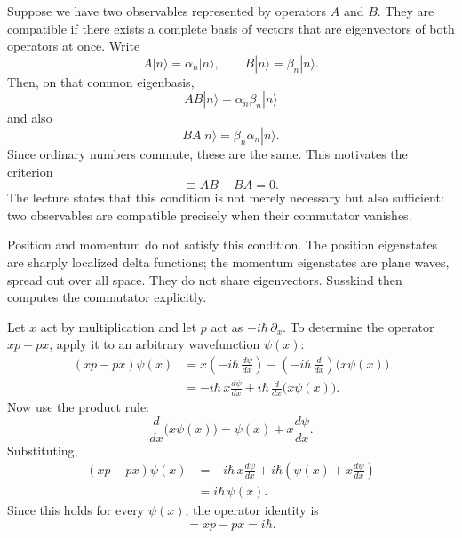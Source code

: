 Suppose we have two observables represented by operators \(A\) and \(B\). They are compatible if there exists a complete basis of vectors that are eigenvectors of both operators at once. Write
\begin{equation}
A|n\rangle = \alpha_n |n\rangle,
\qquad
B|n\rangle = \beta_n |n\rangle.
\end{equation}
Then, on that common eigenbasis,
\begin{equation}
AB|n\rangle = \alpha_n \beta_n |n\rangle
\end{equation}
and also
\begin{equation}
BA|n\rangle = \beta_n \alpha_n |n\rangle.
\end{equation}
Since ordinary numbers commute, these are the same. This motivates the criterion
\begin{equation}
[A,B]\equiv AB-BA=0.
\end{equation}
The lecture states that this condition is not merely necessary but also sufficient: two observables are compatible precisely when their commutator vanishes.

Position and momentum do not satisfy this condition. The position eigenstates are sharply localized delta functions; the momentum eigenstates are plane waves, spread out over all space. They do not share eigenvectors. Susskind then computes the commutator explicitly.

Let \(x\) act by multiplication and let \(p\) act as \(-i\hbar\,\partial_x\). To determine the operator \(xp-px\), apply it to an arbitrary wavefunction \(\psi(x)\):
\begin{align}
(xp-px)\psi(x)
  &= x\!\left(-i\hbar\,\frac{d\psi}{dx}\right)
     -\left(-i\hbar\,\frac{d}{dx}\right)\!\bigl(x\psi(x)\bigr) \\
  &= -i\hbar\,x\frac{d\psi}{dx}
     + i\hbar\,\frac{d}{dx}\bigl(x\psi(x)\bigr).
\end{align}
Now use the product rule:
\begin{equation}
\frac{d}{dx}\bigl(x\psi(x)\bigr)=\psi(x)+x\frac{d\psi}{dx}.
\end{equation}
Substituting,
\begin{align}
(xp-px)\psi(x)
  &= -i\hbar\,x\frac{d\psi}{dx}
     + i\hbar\left(\psi(x)+x\frac{d\psi}{dx}\right) \\
  &= i\hbar\,\psi(x).
\end{align}
Since this holds for every \(\psi(x)\), the operator identity is
\begin{equation}
[x,p]=xp-px=i\hbar.
\end{equation}

